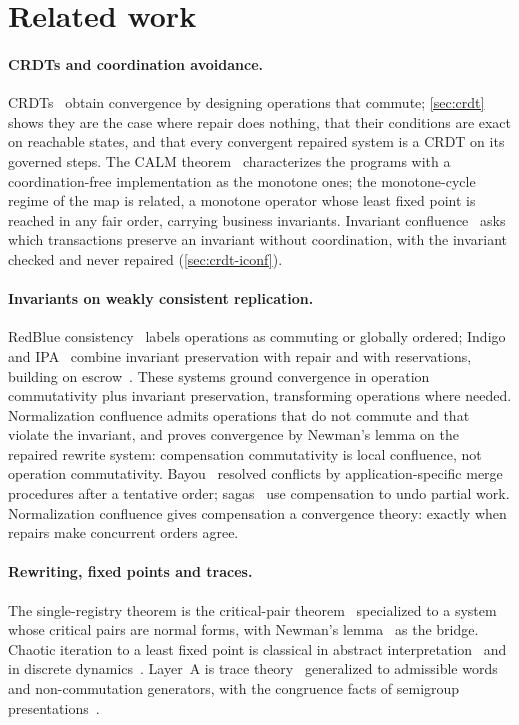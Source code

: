 
\section{Related work}\label{sec:related}

\paragraph{CRDTs and coordination avoidance.}
CRDTs~\cite{shapiro2011} obtain convergence by designing operations that commute; \cref{sec:crdt}
shows they are the case where repair does nothing, that their conditions are exact on reachable states,
and that every convergent repaired system is a CRDT on its governed steps. The CALM
theorem~\cite{hellerstein2010,ameloot2013} characterizes the programs with a coordination-free
implementation as the monotone ones; the monotone-cycle regime of the map is related, a monotone
operator whose least fixed point is reached in any fair order, carrying business invariants.
Invariant confluence~\cite{bailis2014,whittaker2018} asks which transactions preserve an invariant
without coordination, with the invariant checked and never repaired (\cref{sec:crdt-iconf}).

\paragraph{Invariants on weakly consistent replication.}
RedBlue consistency~\cite{li2012} labels operations as commuting or globally ordered; Indigo and
IPA~\cite{balegas2015,balegas2018} combine invariant preservation with repair and with
reservations, building on escrow~\cite{oneil1986}. These systems ground convergence in operation
commutativity plus invariant preservation, transforming operations where needed. Normalization
confluence admits operations that do not commute and that violate the invariant, and proves
convergence by Newman's lemma on the repaired rewrite system: compensation commutativity is local
confluence, not operation commutativity. Bayou~\cite{terry1995} resolved conflicts by
application-specific merge procedures after a tentative order; sagas~\cite{garcia1987} use
compensation to undo partial work. Normalization confluence gives compensation a convergence theory:
exactly when repairs make concurrent orders agree.

\paragraph{Rewriting, fixed points and traces.}
The single-registry theorem is the critical-pair theorem~\cite{knuthbendix1970,huet1980} specialized to
a system whose critical pairs are normal forms, with Newman's lemma~\cite{newman1942} as the bridge.
Chaotic iteration to a least fixed point is classical in abstract interpretation~\cite{cousot1977} and
in discrete dynamics~\cite{robert1986}. Layer~A is trace theory~\cite{cartier1969,mazurkiewicz1977}
generalized to admissible words and non-commutation generators, with the congruence facts of semigroup
presentations~\cite{howie1995}.

